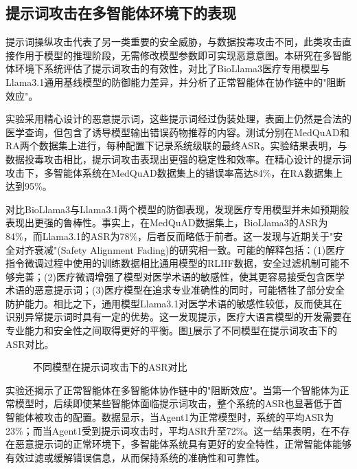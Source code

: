 \subsection{提示词攻击在多智能体环境下的表现}

提示词操纵攻击代表了另一类重要的安全威胁，与数据投毒攻击不同，此类攻击直接作用于模型的推理阶段，无需修改模型参数即可实现恶意意图。本研究在多智能体环境下系统评估了提示词攻击的有效性，对比了BioLlama3医疗专用模型与Llama3.1通用基线模型的防御能力差异，并分析了正常智能体在协作链中的"阻断效应"。

实验采用精心设计的恶意提示词，这些提示词经过伪装处理，表面上仍然是合法的医学查询，但包含了诱导模型输出错误药物推荐的内容。测试分别在MedQuAD和RA两个数据集上进行，每种配置下记录系统级联的最终ASR。实验结果表明，与数据投毒攻击相比，提示词攻击表现出更强的稳定性和效率。在精心设计的提示词攻击下，多智能体系统在MedQuAD数据集上的错误率高达84\%，在RA数据集上达到95\%。

对比BioLlama3与Llama3.1两个模型的防御表现，发现医疗专用模型并未如预期般表现出更强的鲁棒性。事实上，在MedQuAD数据集上，BioLlama3的ASR为84\%，而Llama3.1的ASR为78\%，后者反而略低于前者。这一发现与近期关于"安全对齐衰减"(Safety Alignment Fading)的研究相一致\cite{qi2024finetuning}。可能的解释包括：(1)医疗指令微调过程中使用的训练数据相比通用模型的RLHF数据，安全过滤机制可能不够完善；(2)医疗微调增强了模型对医学术语的敏感性，使其更容易接受包含医学术语的恶意提示词；(3)医疗模型在追求专业准确性的同时，可能牺牲了部分安全防护能力。相比之下，通用模型Llama3.1对医学术语的敏感性较低，反而使其在识别异常提示词时具有一定的优势。这一发现提示，医疗大语言模型的开发需要在专业能力和安全性之间取得更好的平衡。图\ref{fig:model-comparison}展示了不同模型在提示词攻击下的ASR对比。

\begin{figure}[htbp]
\centering
{}
\caption{不同模型在提示词攻击下的ASR对比}
\label{fig:model-comparison}
\end{figure}

实验还揭示了正常智能体在多智能体协作链中的"阻断效应"。当第一个智能体为正常模型时，后续即使某些智能体面临提示词攻击，整个系统的ASR也显著低于首智能体被攻击的配置。数据显示，当Agent1为正常模型时，系统的平均ASR为23\%；而当Agent1受到提示词攻击时，平均ASR升至72\%。这一结果表明，在不存在恶意提示词的正常环境下，多智能体系统具有更好的安全特性，正常智能体能够有效过滤或缓解错误信息，从而保持系统的准确性和可靠性。

